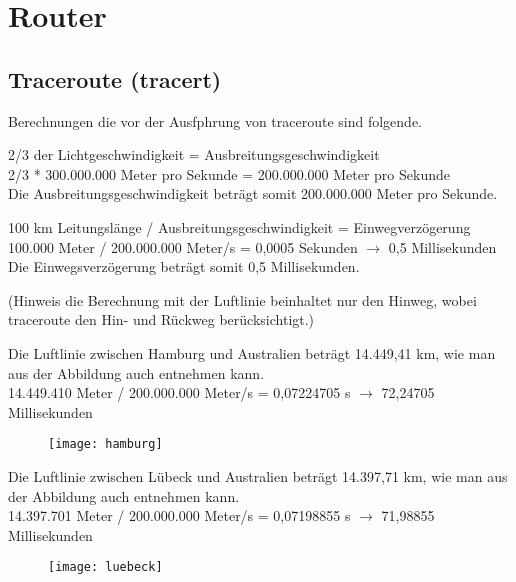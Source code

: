 \documentclass{scrartcl}
\begin{document}
  \newpage
\section[Versuch 5 Router]{Router}
  
  \subsection[Aufgabe 2 Traceroute (tracert)]{Traceroute (tracert)}
  Berechnungen die vor der Ausfphrung von traceroute sind folgende.
  
  2/3 der Lichtgeschwindigkeit = Ausbreitungsgeschwindigkeit\\
  2/3 * 300.000.000 Meter pro Sekunde = 200.000.000 Meter pro Sekunde\\
  Die Ausbreitungsgeschwindigkeit beträgt somit 200.000.000 Meter pro Sekunde.
  
  100 km Leitungslänge / Ausbreitungsgeschwindigkeit = Einwegverzögerung\\
  100.000 Meter / 200.000.000 Meter/s = 0,0005 Sekunden $\rightarrow$ 0,5 Millisekunden\\
  Die Einwegsverzögerung beträgt somit 0,5 Millisekunden.
  
  (Hinweis die Berechnung mit der Luftlinie beinhaltet nur den Hinweg, wobei traceroute den Hin- und Rückweg berücksichtigt.)
  
  Die Luftlinie zwischen Hamburg und Australien beträgt 14.449,41 km, wie man aus der Abbildung auch entnehmen kann.\\
  14.449.410 Meter / 200.000.000 Meter/s = 0,07224705 s $\rightarrow$ 72,24705 Millisekunden
  
   \begin{figure}[htbp]
   \centering
   \texttt{[image: hamburg]}
   \label{fig:hamburg}
   \end{figure}

 \newpage
   Die Luftlinie zwischen Lübeck und Australien beträgt 14.397,71 km, wie man aus der Abbildung auch entnehmen kann.\\
  14.397.701 Meter / 200.000.000 Meter/s = 0,07198855 s $\rightarrow$ 71,98855 Millisekunden
  
 \begin{figure}[htbp]
   \centering
   \texttt{[image: luebeck]}
   \label{fig:luebeck}\\
   \end{figure}
   
\end{document}
